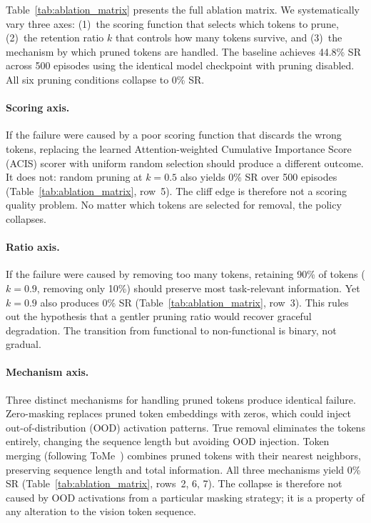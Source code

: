Table~\ref{tab:ablation_matrix} presents the full ablation matrix.
We systematically vary three axes: (1)~the scoring function that selects which tokens to prune, (2)~the retention ratio $k$ that controls how many tokens survive, and (3)~the mechanism by which pruned tokens are handled.
The baseline achieves 44.8\% SR across 500 episodes using the identical model checkpoint with pruning disabled.
All six pruning conditions collapse to 0\% SR.

\paragraph{Scoring axis.}
If the failure were caused by a poor scoring function that discards the wrong tokens, replacing the learned Attention-weighted Cumulative Importance Score (ACIS) scorer with uniform random selection should produce a different outcome.
It does not: random pruning at $k{=}0.5$ also yields 0\% SR over 500 episodes (Table~\ref{tab:ablation_matrix}, row~5).
The cliff edge is therefore not a scoring quality problem.
No matter which tokens are selected for removal, the policy collapses.

\paragraph{Ratio axis.}
If the failure were caused by removing too many tokens, retaining 90\% of tokens ($k{=}0.9$, removing only 10\%) should preserve most task-relevant information.
Yet $k{=}0.9$ also produces 0\% SR (Table~\ref{tab:ablation_matrix}, row~3).
This rules out the hypothesis that a gentler pruning ratio would recover graceful degradation.
The transition from functional to non-functional is binary, not gradual.

\paragraph{Mechanism axis.}
Three distinct mechanisms for handling pruned tokens produce identical failure.
Zero-masking replaces pruned token embeddings with zeros, which could inject out-of-distribution (OOD) activation patterns.
True removal eliminates the tokens entirely, changing the sequence length but avoiding OOD injection.
Token merging (following ToMe~\cite{bolya2023tome}) combines pruned tokens with their nearest neighbors, preserving sequence length and total information.
All three mechanisms yield 0\% SR (Table~\ref{tab:ablation_matrix}, rows~2, 6, 7).
The collapse is therefore not caused by OOD activations from a particular masking strategy; it is a property of any alteration to the vision token sequence.

